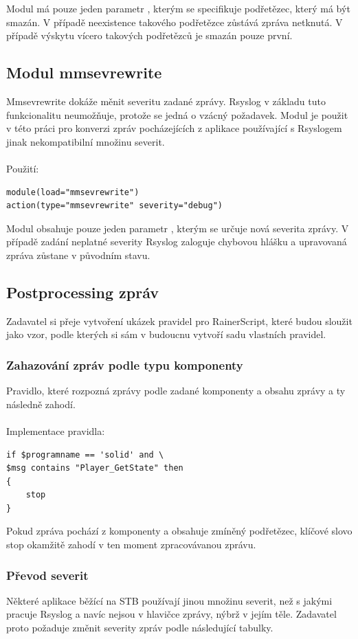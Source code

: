 \documentclass[thesis=B,czech]{FITthesis}[2012/06/26]
\begin{document}
Modul má pouze jeden parametr , kterým se specifikuje podřetězec, který má být smazán. V případě neexistence takového podřetězce zůstává zpráva netknutá. V případě výskytu vícero takových podřetězců je smazán pouze první.

\subsection{Modul mmsevrewrite}
Mmsevrewrite dokáže měnit severitu zadané zprávy. Rsyslog v základu tuto funkcionalitu neumožňuje, protože se jedná o vzácný požadavek. Modul je použit v této práci pro konverzi zpráv pocházejících z aplikace používající s Rsyslogem jinak nekompatibilní množinu severit.
\\
\\
Použití:
\begin{lstlisting}[style=RainerScriptSimpleStyle]
module(load="mmsevrewrite")
action(type="mmsevrewrite" severity="debug")
\end{lstlisting}

Modul obsahuje pouze jeden parametr , kterým se určuje nová severita zprávy. V případě zadání neplatné severity Rsyslog zaloguje chybovou hlášku a upravovaná zpráva zůstane v původním stavu.

\subsection{Postprocessing zpráv}
Zadavatel si přeje vytvoření ukázek pravidel pro RainerScript, které budou sloužit jako vzor, podle kterých si sám v budoucnu vytvoří sadu vlastních pravidel.

\subsubsection{Zahazování zpráv podle typu komponenty}
Pravidlo, které rozpozná zprávy podle zadané komponenty a obsahu zprávy a ty následně zahodí.
\\
\\
Implementace pravidla:
\begin{lstlisting}[style=RainerScriptStyle]
if $programname == 'solid' and \
$msg contains "Player_GetState" then
{	
	stop
}
\end{lstlisting}
Pokud zpráva pochází z komponenty  a obsahuje zmíněný podřetězec, klíčové slovo stop okamžitě zahodí v ten moment zpracovávanou zprávu.
\\
\subsubsection{Převod severit}
Některé aplikace běžící na STB používají jinou množinu severit, než s jakými pracuje Rsyslog a navíc nejsou v hlavičce zprávy, nýbrž v jejím těle.
Zadavatel proto požaduje změnit severity zpráv podle následující tabulky.
\end{document}
